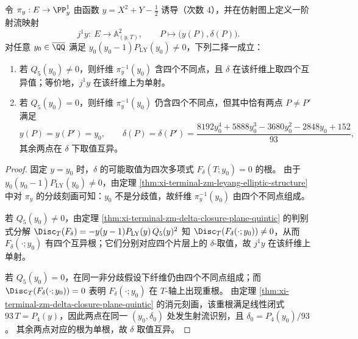 \begin{proposition}\label{prop:xi-terminal-zm-leyang-first-jet-fiber-collision-q5}
令 \(\pi_y:E\to\PP^1_y\) 由函数 \(y=X^2+Y-\tfrac12\) 诱导（次数 \(4\)），并在仿射图上定义一阶射流映射
\[
j^{1}y:\ E\longrightarrow \mathbb A^{2}_{(y,T)},
\qquad
P\longmapsto \bigl(y(P),\delta(P)\bigr).
\]
对任意 \(y_0\in\overline{\QQ}\) 满足 \(y_0(y_0-1)P_{\mathrm{LY}}(y_0)\neq 0\)，下列二择一成立：
\begin{enumerate}
  \item 若 \(Q_5(y_0)\neq 0\)，则纤维 \(\pi_y^{-1}(y_0)\) 含四个不同点，且 \(\delta\) 在该纤维上取四个互异值；等价地，\(j^1y\) 在该纤维上为单射。
  \item 若 \(Q_5(y_0)=0\)，则纤维 \(\pi_y^{-1}(y_0)\) 仍含四个不同点，但其中恰有两点 \(P\neq P'\) 满足
  \[
  y(P)=y(P')=y_0,
  \qquad
  \delta(P)=\delta(P')=\frac{8192y_0^{4}+5888y_0^{3}-3680y_0^{2}-2848y_0+152}{93},
  \]
  其余两点在 \(\delta\) 下取值互异。
\end{enumerate}
\end{proposition}
\begin{proof}
固定 \(y=y_0\) 时，\(\delta\) 的可能取值为四次多项式 \(F_\delta(T;y_0)=0\) 的根。
由于 \(y_0(y_0-1)P_{\mathrm{LY}}(y_0)\neq 0\)，由定理 \ref{thm:xi-terminal-zm-leyang-elliptic-structure} 中对 \(\pi_y\) 的分歧刻画可知：\(y_0\) 不是分歧值，故纤维 \(\pi_y^{-1}(y_0)\) 由四个不同点组成。
\par
若 \(Q_5(y_0)\neq 0\)，由定理 \ref{thm:xi-terminal-zm-delta-closure-plane-quintic} 的判别式分解
\(
\Disc_T(F_\delta)=-y(y-1)P_{\mathrm{LY}}(y)\,Q_5(y)^2
\)
知 \(\Disc_T(F_\delta(\cdot;y_0))\neq 0\)，从而 \(F_\delta(\cdot;y_0)\) 有四个互异根；它们分别对应四个片层上的 \(\delta\)-取值，故 \(j^1y\) 在该纤维上单射。
\par
若 \(Q_5(y_0)=0\)，在同一非分歧假设下纤维仍由四个不同点组成；而 \(\Disc_T(F_\delta(\cdot;y_0))=0\) 表明 \(F_\delta(\cdot;y_0)\) 在 \(T\)-轴上出现重根。
由定理 \ref{thm:xi-terminal-zm-delta-closure-plane-quintic} 的消元刻画，该重根满足线性闭式
\(
93\,T=P_4(y)
\)，因此两点在同一 \((y_0,\delta_0)\) 处发生射流识别，且 \(\delta_0=P_4(y_0)/93\)。
其余两点对应的根为单根，故 \(\delta\) 取值互异。
\end{proof}

